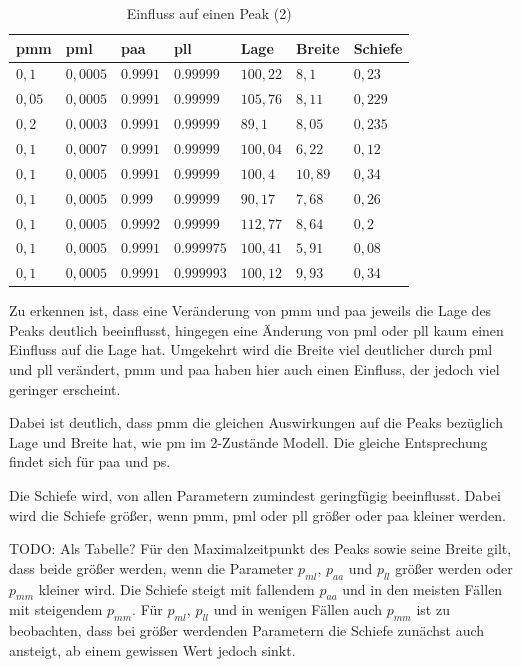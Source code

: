 \begin{table}[h]
\centering
\caption{Einfluss auf einen Peak (2)}
\label{einfluss_t100}
\begin{tabular}{|l|l|l|l||l|l|l|}
\hline
pmm & pml    & paa    & pll      & Lage  & Breite & Schiefe \\ \hline \hline
 $0,1$ & $0,0005$  & $0.9991$  & $0.99999$  & $100,22$  & $8,1$  & $0,23$ \\ \hline
\cellcolor{yellow} $0,05$ & $0,0005$  & $0.9991$  & $0.99999$  & $105,76$  & $8,11$  & $0,229$ \\ \hline
\cellcolor{yellow} $0,2$ & $0,0003$  & $0.9991$  & $0.99999$  & $89,1$  & $8,05$  & $0,235$ \\ \hline
 $0,1$ & \cellcolor{yellow} $0,0007$  & $0.9991$  & $0.99999$  & $100,04$  & $6,22$  & $0,12$ \\ \hline
 $0,1$ & \cellcolor{yellow} $0,0005$  & $0.9991$  & $0.99999$  & $100,4$  & $10,89$  & $0,34$ \\ \hline
 $0,1$ & $0,0005$  & \cellcolor{yellow} $0.999$  & $0.99999$  & $90,17$  & $7,68$  & $0,26$ \\ \hline
 $0,1$ & $0,0005$  & \cellcolor{yellow} $0.9992$  & $0.99999$  & $112,77$  & $8,64$  & $0,2$ \\ \hline
 $0,1$ & $0,0005$  & $0.9991$  & \cellcolor{yellow} $0.999975$  & $100,41$  & $5,91$  & $0,08$ \\ \hline
 $0,1$ & $0,0005$  & $0.9991$  & \cellcolor{yellow} $0.999993$  & $100,12$  & $9,93$  & $0,34$ \\ \hline
\end{tabular}
\end{table}

Zu erkennen ist, dass eine Veränderung von pmm und paa jeweils die Lage des Peaks deutlich beeinflusst, hingegen eine Änderung von pml oder pll kaum einen Einfluss auf die Lage hat. Umgekehrt wird die Breite viel deutlicher durch pml und pll verändert, pmm und paa haben hier auch einen Einfluss, der jedoch viel geringer erscheint. 

Dabei ist deutlich, dass pmm die gleichen Auswirkungen auf die Peaks bezüglich Lage und Breite hat, wie pm im 2-Zustände Modell. Die gleiche Entsprechung findet sich für paa und ps.

Die Schiefe wird, von allen Parametern zumindest geringfügig beeinflusst. Dabei wird die Schiefe größer, wenn pmm, pml oder pll größer oder paa kleiner werden.
 
TODO: Als Tabelle? 
Für den Maximalzeitpunkt des Peaks sowie seine Breite gilt, dass beide größer werden, wenn die Parameter $p_{ml}$, $p_{aa}$ und $p_{ll}$ größer werden oder $p_{mm}$ kleiner wird. 
Die Schiefe steigt mit fallendem $p_{aa}$ und in den meisten Fällen mit steigendem $p_{mm}$. Für $p_{ml}$, $p_{ll}$ und in wenigen Fällen auch $p_{mm}$ ist zu beobachten, dass bei größer werdenden Parametern die Schiefe zunächst auch ansteigt, ab einem gewissen Wert jedoch sinkt.

